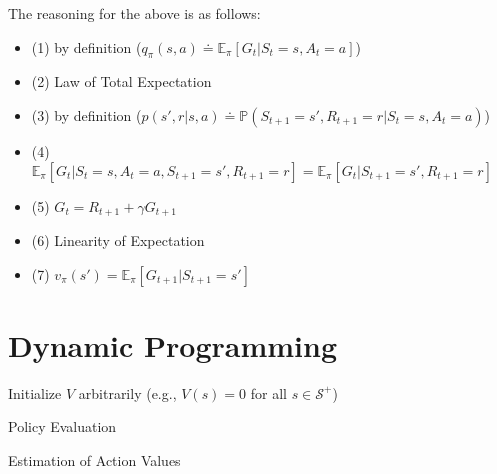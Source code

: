 \documentclass[12pt]{amsart}
\begin{document}
\vspace{.5in}

The reasoning for the above is as follows:
\vspace{.2in}
\begin{itemize}
\item (1) by definition ($q_\pi(s,a) \doteq \mathbb{E}_{\pi}[ G_t | S_t = s, A_t = a ]$) \\
\item (2) Law of Total Expectation\\
\item (3) by definition ($p(s',r|s,a)\doteq\mathbb{P}(S_{t+1}=s', R_{t+1}=r|S_t=s, A_t=a)$)\\
\item (4) $\mathbb{E}_{\pi}[ G_{t} | S_t = s, A_t = a, S_{t+1}=s', R_{t+1}=r] = \mathbb{E}_{\pi}[ G_{t} | S_{t+1}=s', R_{t+1}=r]$\\
\item (5) $G_t = R_{t+1} + \gamma G_{t+1}$\\
\item (6) Linearity of Expectation\\
\item (7) $v_\pi(s') = \mathbb{E}_\pi[G_{t+1} | S_{t+1}=s']$
\end{itemize}

\newpage

\section{Dynamic Programming}

\begin{algorithm}
    	Initialize $V$ arbitrarily (e.g., $V(s)=0$ for all $s \in \mathcal{S}^+$)\\
	\caption{Policy Evaluation}
\end{algorithm}

\begin{algorithm}
		
	\caption{Estimation of Action Values}
\end{algorithm}
\end{document}
